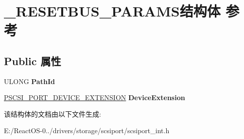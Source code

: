 \hypertarget{struct___r_e_s_e_t_b_u_s___p_a_r_a_m_s}{}\section{\+\_\+\+R\+E\+S\+E\+T\+B\+U\+S\+\_\+\+P\+A\+R\+A\+M\+S结构体 参考}
\label{struct___r_e_s_e_t_b_u_s___p_a_r_a_m_s}
\subsection*{Public 属性}
\begin{DoxyCompactItemize}
\item 
\mbox{\label{struct___r_e_s_e_t_b_u_s___p_a_r_a_m_s_a460d6137592e80c205a9a7e41275f289}} 
U\+L\+O\+NG {\bfseries Path\+Id}
\item 
\mbox{\label{struct___r_e_s_e_t_b_u_s___p_a_r_a_m_s_a5da0e28a619f0b9247ed26cd0be4ae0f}} 
\hyperlink{struct_s_c_s_i___p_o_r_t___d_e_v_i_c_e___e_x_t_e_n_s_i_o_n}{P\+S\+C\+S\+I\+\_\+\+P\+O\+R\+T\+\_\+\+D\+E\+V\+I\+C\+E\+\_\+\+E\+X\+T\+E\+N\+S\+I\+ON} {\bfseries Device\+Extension}
\end{DoxyCompactItemize}


该结构体的文档由以下文件生成\+:\begin{DoxyCompactItemize}
\item 
E\+:/\+React\+O\+S-\/0../drivers/storage/scsiport/scsiport\+\_\+int.\+h\end{DoxyCompactItemize}
